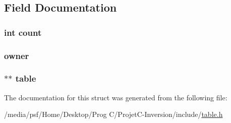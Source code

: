 \subsection{Field Documentation}
\hypertarget{structcolor__table_ad43c3812e6d13e0518d9f8b8f463ffcf}{
\subsubsection[{count}]{\setlength{\rightskip}{0pt plus 5cm}int count}}\label{structcolor__table_ad43c3812e6d13e0518d9f8b8f463ffcf}
\hypertarget{structcolor__table_a4641ea1034fd962e8e0ef9cf6b3aefdc}{
\subsubsection[{owner}]{ owner}}\label{structcolor__table_a4641ea1034fd962e8e0ef9cf6b3aefdc}
\hypertarget{structcolor__table_afc215ebb482518a202f1703594fd51a0}{
\subsubsection[{table}]{$\ast$$\ast$ table}}\label{structcolor__table_afc215ebb482518a202f1703594fd51a0}


The documentation for this struct was generated from the following file\-:\begin{DoxyCompactItemize}
\item 
/media/psf/\-Home/\-Desktop/\-Prog C/\-Projet\-C-\/\-Inversion/include/\hyperlink{table_8h}{table.\-h}\end{DoxyCompactItemize}

